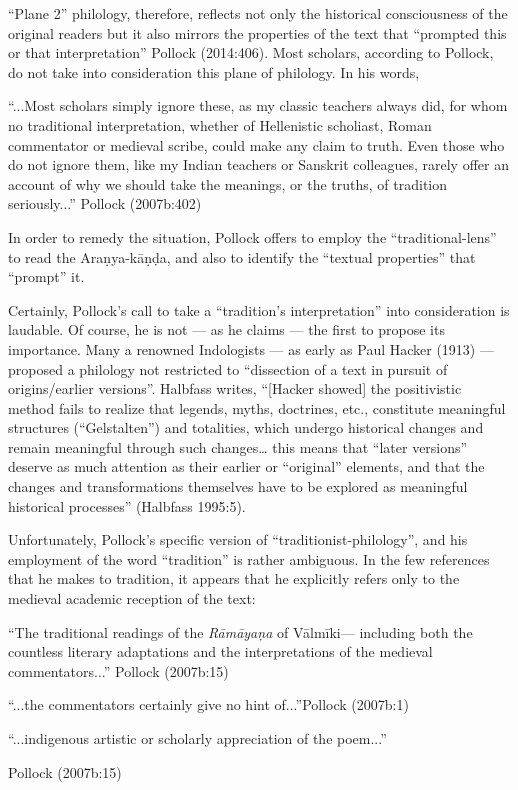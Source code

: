 “Plane 2” philology, therefore, reflects not only the historical consciousness of the original readers but it also mirrors the properties of the text that “prompted this or that interpretation” Pollock (2014:406). Most scholars, according to Pollock, do not take into consideration this plane of philology. In his words,

\begin{myquote} 
“...Most scholars simply ignore these, as my classic teachers always did, for whom no traditional interpretation, whether of Hellenistic scholiast, Roman commentator or medieval scribe, could make any claim to truth. Even those who do not ignore them, like my Indian teachers or Sanskrit colleagues, rarely offer an account of why we should take the meanings, or the truths, of tradition seriously...”
\hfill Pollock (2007b:402)
\end{myquote}

In order to remedy the situation, Pollock offers to employ the “traditional-lens” to read the Araṇya-kāṇḍa, and also to identify the “textual properties” that “prompt” it.  
	
Certainly, Pollock’s call to take a “tradition’s interpretation” into consideration is laudable. Of course, he is not --- as he claims --- the first to propose its importance. Many a renowned Indologists --- as early as Paul Hacker (1913) --- proposed a philology not restricted to “dissection of a text in pursuit of origins/earlier versions”. Halbfass writes, “[Hacker showed] the positivistic method fails to realize that legends, myths, doctrines, etc., constitute meaningful structures (“Gelstalten”) and totalities, which undergo historical changes and remain meaningful through such changes… this means that “later versions” deserve as much attention as their earlier or “original” elements, and that the changes and transformations themselves have to be explored as meaningful historical processes” (Halbfass 1995:5). 

Unfortunately, Pollock’s specific version of “traditionist-philology”, and his employment of the word “tradition” is rather ambiguous. In the few references that he makes to tradition, it appears that he explicitly refers only to the medieval academic reception of the text: 

\begin{myquote}
“The traditional readings of the {\sl Rāmāyaṇa} of Vālmīki--- including both the countless literary adaptations and the interpretations of the medieval commentators...”
\hfill	Pollock (2007b:15)

\smallskip

“...the commentators certainly give no hint of...”\hfill  Pollock (2007b:1)
	
“...indigenous artistic or scholarly appreciation of the poem...''

\hfill  Pollock (2007b:15)
\end{myquote}

